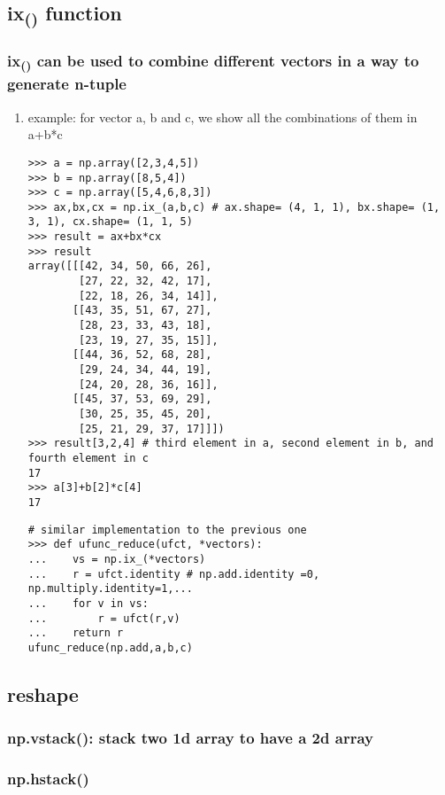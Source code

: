 \documentclass[11pt]{article}
\begin{document}
\subsection{ix\textsubscript{()} function}
\label{sec:org3cfb482}
\subsubsection{ix\textsubscript{()} can be used to combine different vectors in a way to generate n-tuple}
\label{sec:orgf5ccafa}
\begin{enumerate}
\item example: for vector a, b and c, we show all the combinations of them in a+b*c
\label{sec:orgfc8ed59}
\begin{verbatim}
>>> a = np.array([2,3,4,5])
>>> b = np.array([8,5,4])
>>> c = np.array([5,4,6,8,3])
>>> ax,bx,cx = np.ix_(a,b,c) # ax.shape= (4, 1, 1), bx.shape= (1, 3, 1), cx.shape= (1, 1, 5)
>>> result = ax+bx*cx
>>> result
array([[[42, 34, 50, 66, 26],
        [27, 22, 32, 42, 17],
        [22, 18, 26, 34, 14]],
       [[43, 35, 51, 67, 27],
        [28, 23, 33, 43, 18],
        [23, 19, 27, 35, 15]],
       [[44, 36, 52, 68, 28],
        [29, 24, 34, 44, 19],
        [24, 20, 28, 36, 16]],
       [[45, 37, 53, 69, 29],
        [30, 25, 35, 45, 20],
        [25, 21, 29, 37, 17]]])
>>> result[3,2,4] # third element in a, second element in b, and fourth element in c
17
>>> a[3]+b[2]*c[4]
17
\end{verbatim}

\begin{verbatim}
# similar implementation to the previous one
>>> def ufunc_reduce(ufct, *vectors):
...    vs = np.ix_(*vectors)
...    r = ufct.identity # np.add.identity =0, np.multiply.identity=1,...
...    for v in vs:
...        r = ufct(r,v)
...    return r
ufunc_reduce(np.add,a,b,c)
\end{verbatim}
\end{enumerate}
\subsection{reshape}
\label{sec:org3d1e61b}
\subsubsection{np.vstack(): stack two 1d array to have a 2d array}
\label{sec:org588f464}
\subsubsection{np.hstack()}
\label{sec:org4cfb326}
\end{document}
